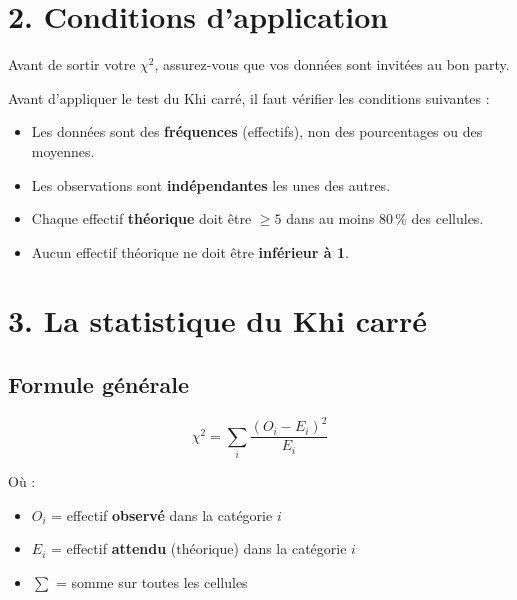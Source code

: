 \documentclass[12pt, a4paper]{article}
\begin{document}
\section{2. Conditions d'application}

\begin{attentionbox}
Avant de sortir votre $\chi^2$, assurez-vous que vos données sont invitées au bon party.
\end{attentionbox}

\vspace{0.5em}

Avant d'appliquer le test du Khi carré, il faut vérifier les conditions suivantes :

\begin{itemize}
  \item Les données sont des \textbf{fréquences} (effectifs), non des pourcentages ou
        des moyennes.
  \item Les observations sont \textbf{indépendantes} les unes des autres.
  \item Chaque effectif \textbf{théorique} doit être $\geq 5$ dans au moins 80\,\% des
        cellules.
  \item Aucun effectif théorique ne doit être \textbf{inférieur à 1}.
\end{itemize}

\section{3. La statistique du Khi carré}

\subsection{Formule générale}

\begin{equation}
  \chi^2 = \sum_{i} \frac{(O_i - E_i)^2}{E_i}
\end{equation}

Où :
\begin{itemize}
  \item $O_i$ = effectif \textbf{observé} dans la catégorie $i$
  \item $E_i$ = effectif \textbf{attendu} (théorique) dans la catégorie $i$
  \item $\sum$ = somme sur toutes les cellules
\end{itemize}
\end{document}
